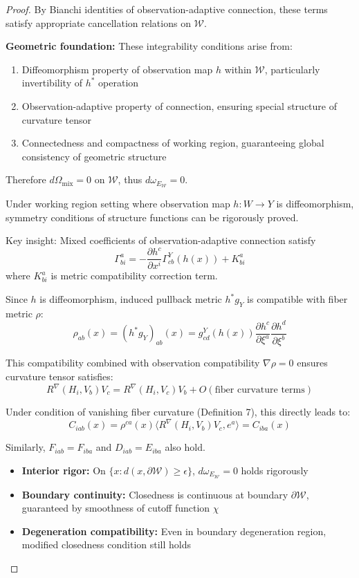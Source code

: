 \documentclass[10pt,a4paper]{amsart}
\begin{document}
\begin{proof}
By Bianchi identities of observation-adaptive connection, these terms satisfy appropriate cancellation relations on $\mathcal{W}$.

\textbf{Geometric foundation:} These integrability conditions arise from:
\begin{enumerate}
\item Diffeomorphism property of observation map $h$ within $\mathcal{W}$, particularly invertibility of $h^*$ operation
\item Observation-adaptive property of connection, ensuring special structure of curvature tensor
\item Connectedness and compactness of working region, guaranteeing global consistency of geometric structure
\end{enumerate}

Therefore $d\Omega_{\text{mix}} = 0$ on $\mathcal{W}$, thus $d\omega_{E_{\mathcal{W}}} = 0$.


\begin{remark}
Under working region setting where observation map $h: W \to Y$ is diffeomorphism, symmetry conditions of structure functions can be rigorously proved.

Key insight: Mixed coefficients of observation-adaptive connection satisfy
$$\Gamma^a_{bi} = -\frac{\partial h^c}{\partial x^i}\Gamma^Y_{cb}(h(x)) + K^a_{bi}$$
where $K^a_{bi}$ is metric compatibility correction term.

Since $h$ is diffeomorphism, induced pullback metric $h^*g_Y$ is compatible with fiber metric $\rho$:
$$\rho_{ab}(x) = (h^*g_Y)_{ab}(x) = g^Y_{cd}(h(x))\frac{\partial h^c}{\partial \xi^a}\frac{\partial h^d}{\partial \xi^b}$$

This compatibility combined with observation compatibility $\nabla \rho = 0$ ensures curvature tensor satisfies:
$$R^\nabla(H_i, V_b)V_c = R^\nabla(H_i, V_c)V_b + O(\text{fiber curvature terms})$$

Under condition of vanishing fiber curvature (Definition 7), this directly leads to:
$$C_{iab}(x) = \rho^{ca}(x)\langle R^\nabla(H_i, V_b)V_c, e^a\rangle = C_{iba}(x)$$

Similarly, $F_{iab} = F_{iba}$ and $D_{iab} = E_{iba}$ also hold.
\end{remark}

\begin{remark}
\begin{itemize}
\item \textbf{Interior rigor:} On $\{x : d(x,\partial \mathcal{W}) \geq \epsilon\}$, $d\omega_{E_{\mathcal{W}}} = 0$ holds rigorously
\item \textbf{Boundary continuity:} Closedness is continuous at boundary $\partial \mathcal{W}$, guaranteed by smoothness of cutoff function $\chi$
\item \textbf{Degeneration compatibility:} Even in boundary degeneration region, modified closedness condition still holds
\end{itemize}
\end{remark}
\end{proof}
\end{document}
